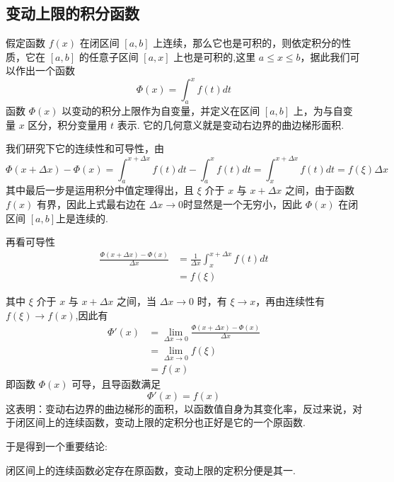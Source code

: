 \subsection{变动上限的积分函数}
\label{sec:variable-upper-limit-integral-function}

假定函数 $f(x)$ 在闭区间 $[a,b]$ 上连续，那么它也是可积的，则依定积分的性质，它在 $[a,b]$ 的任意子区间 $[a,x]$ 上也是可积的,这里 $a \leqslant x \leqslant b$，据此我们可以作出一个函数
\[ \Phi(x) = \int_a^x f(t) dt \]
函数 $\Phi(x)$ 以变动的积分上限作为自变量，并定义在区间 $[a,b]$ 上，为与自变量 $x$ 区分，积分变量用 $t$ 表示. 它的几何意义就是变动右边界的曲边梯形面积.

我们研究下它的连续性和可导性，由
\[ \Phi(x+\Delta x) - \Phi(x) = \int_a^{x+\Delta x} f(t)dt - \int_a^x f(t)dt = \int_x^{x+\Delta x} f(t)dt = f(\xi)\Delta x \]
其中最后一步是运用积分中值定理得出，且 $\xi$ 介于 $x$ 与 $x+\Delta x$ 之间，由于函数 $f(x)$ 有界，因此上式最右边在 $\Delta x \rightarrow 0$时显然是一个无穷小，因此 $\Phi(x)$ 在闭区间 $[a,b]$上是连续的.

再看可导性
\begin{equation*}
  \begin{split}
    \frac{\Phi(x+\Delta x)-\Phi(x)}{\Delta x} & = \frac{1}{\Delta x}\int_x^{x+\Delta x} f(t) dt \\
    & = f(\xi)
  \end{split}
\end{equation*}

其中 $\xi$ 介于 $x$ 与 $x+\Delta x$ 之间，当 $\Delta x \rightarrow 0$ 时，有 $\xi \rightarrow x$，再由连续性有 $f(\xi) \rightarrow f(x)$,因此有
\begin{equation*}
  \begin{split}
    \Phi'(x) & = \lim_{\Delta x \rightarrow 0}   \frac{\Phi(x+\Delta x)-\Phi(x)}{\Delta x} \\
    & = \lim_{\Delta x \rightarrow 0} f(\xi) \\
    & = f(x)
  \end{split}
\end{equation*}
即函数 $\Phi(x)$ 可导，且导函数满足
\[ \Phi'(x) = f(x) \]
这表明：变动右边界的曲边梯形的面积，以函数值自身为其变化率，反过来说，对于闭区间上的连续函数，变动上限的定积分也正好是它的一个原函数.

于是得到一个重要结论:
\begin{inference}
  闭区间上的连续函数必定存在原函数，变动上限的定积分便是其一.
\end{inference}

